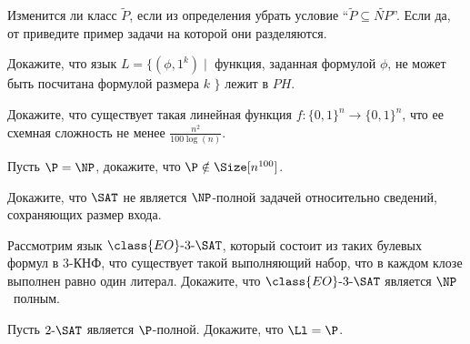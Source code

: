 \setcounter{curtask}{1}

\begin{task}
    Изменится ли класс $\widetilde{P}$, если из определения убрать условие ``$\widetilde{P} \subseteq \widetilde{NP}$''. Если да,
    от приведите пример задачи на которой они разделяются.
\end{task}

\begin{task}
    Докажите, что язык $L = \{(\phi, 1^k) \mid$ функция, заданная формулой $\phi$, не может быть посчитана формулой размера $k$ $\}$
    лежит в $PH$.
\end{task}


\begin{task}
    Докажите, что существует такая линейная функция $f: \{0, 1\}^{n} \to \{0, 1\}^{n}$, что ее схемная сложность не менее
    $\frac{n^2}{100 \log(n)}$.  
\end{task}


\begin{task}
    Пусть $\P = \NP$, докажите, что $\P \notin \Size[n^{100}]$.
\end{task}

\begin{task}
	Докажите, что $\SAT$ не является $\NP$-полной задачей относительно сведений, сохраняющих размер входа.
\end{task}

\begin{task}
    Рассмотрим язык $\class{EO}\text{-}3\text{-}\SAT$, который состоит из таких булевых формул в $3$-КНФ, что существует такой
    выполняющий набор, что в каждом клозе выполнен равно один литерал. Докажите, что $\class{EO}\text{-}3\text{-}\SAT$ является
    $\NP$~полным.
\end{task}

\begin{task}
	Пусть $2\text{-}\SAT$ является $\P$-полной. Докажите, что $\Ll = \P$.
\end{task}
